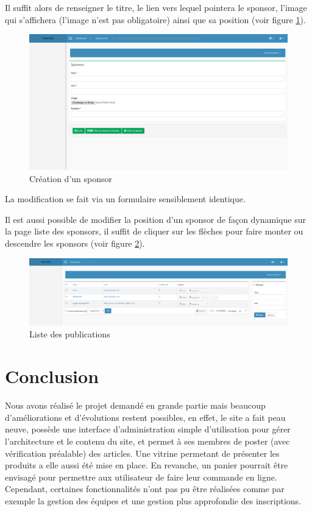 \documentclass[a4paper,12pt, notitlepage]{report}
\begin{document}
Il suffit alors de renseigner le titre, le lien vers lequel pointera le sponsor, l’image qui s’affichera (l’image n’est pas obligatoire) ainsi que sa position (voir figure \ref{ajout-sponsor}).
\begin{figure} 
    \caption{Création d'un sponsor}  
    \label{ajout-sponsor}
    \centering
    \includegraphics[scale=0.3]{images/ajoutSponsor.png}
\end{figure}
La modification se fait via un formulaire sensiblement identique. 

Il est aussi possible de modifier la position d’un sponsor de façon dynamique sur la page liste des sponsors, il suffit de cliquer sur les flèches pour faire monter ou descendre les sponsors (voir figure \ref{liste-sponsor}).
\begin{figure} 
    \caption{Liste des publications}  
    \label{liste-sponsor}
    \centering
    \includegraphics[scale=0.3]{images/liste-sponsor.png}
\end{figure}

\chapter*{Conclusion}
Nous avons réalisé le projet demandé en grande partie mais beaucoup d’améliorations et d’évolutions restent possibles, en effet, le site a fait peau neuve, possède une interface d’administration simple d’utilisation pour gérer l’architecture et le contenu du site, et permet à ses membres de poster (avec vérification préalable) des articles. Une vitrine permetant de présenter les produits a elle aussi été mise en place. En revanche, un panier pourrait être envisagé pour permettre aux utilisateur de faire leur commande en ligne. 
Cependant, certaines fonctionnalités n’ont pas pu être réalisées comme par exemple la gestion des équipes et une gestion plus approfondie des inscriptions.
\end{document}
